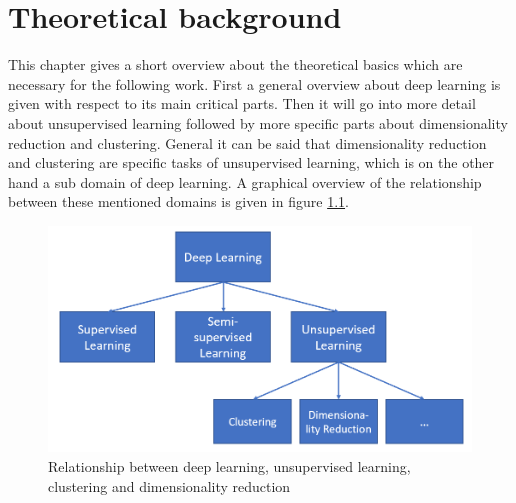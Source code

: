 \documentclass[12pt,DIV14,BCOR12mm,a4paper,footexclude,headinclude,halfparskip-,twoside,openright,openany,cleardoubleempty,idxtotoc,bibtotoc]{scrreprt} %
\numberwithin{equation}{chapter}
\begin{document}
\chapter{Theoretical background}
This chapter gives a short overview about the theoretical basics which are necessary for the following work. First a general overview about deep learning is given with respect to its main critical parts. Then it will go into more detail about unsupervised learning followed by more specific parts about dimensionality reduction and clustering. General it can be said that dimensionality reduction and clustering are specific tasks of unsupervised learning, which is on the other hand a sub domain of deep learning. A graphical overview of the relationship between these mentioned domains is given in figure \ref{fig:Relationship_DL}. 
\begin{figure}[htb!]
	\centering
	\includegraphics[width=0.5\linewidth]{Graphiken/Overview_Deep_Learning}
	\caption{Relationship between deep learning, unsupervised learning, clustering and dimensionality reduction}
	\label{fig:Relationship_DL}
\end{figure}
\end{document}
